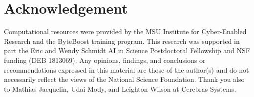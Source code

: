 \section*{Acknowledgement}
{\footnotesize
Computational resources were provided by the MSU Institute for Cyber-Enabled Research and the ByteBoost training program.
This research was supported in part the Eric and Wendy Schmidt AI in Science Postdoctoral Fellowship and NSF funding (DEB 1813069).
Any opinions, findings, and conclusions or recommendations expressed in this material are those of the author(s) and do not necessarily reflect the views of the National Science Foundation.
Thank you also to Mathias Jacquelin, Udai Mody, and Leighton Wilson at Cerebras Systems.
}
